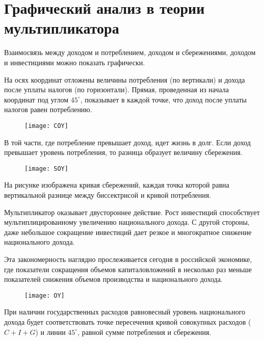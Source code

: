 \pagebreak %

\chapter{Графический анализ в теории мультипликатора}

Взаимосвязь между доходом и потреблением, доходом и сбережениями, доходом и
инвестициями можно показать графически.

На осях координат отложены величины потребления (по вертикали) и дохода после
уплаты налогов (по горизонтали). Прямая, проведенная из начала координат под
углом \( 45^\circ \), показывает в каждой точке, что доход после уплаты налогов
равен потреблению.

\begin{figure}[h!]
    \texttt{[image: COY]}
\end{figure}

В той части, где потребление превышает доход, идет жизнь в долг. Если доход
превышает уровень потребления, то разница образует величину сбережения.

\begin{figure}[h!]
    \texttt{[image: SOY]}
\end{figure}

На рисунке изображена кривая сбережений, каждая точка которой равна
вертикальной разнице между биссектрисой и кривой потребления.
 
Мультипликатор оказывает двустороннее действие. Рост инвестиций способствует
мультиплицированному увеличению национального дохода. С другой стороны, даже
небольшое сокращение инвестиций дает резкое и многократное снижение
национального дохода.

Эта закономерность наглядно прослеживается сегодня в российской экономике, где
показатели сокращения объемов капиталовложений в несколько раз меньше
показателей снижения объемов производства и национального дохода.

\begin{figure}[h!]
    \texttt{[image: OY]}
\end{figure}
 
При наличии государственных расходов равновесный уровень национального дохода
будет соответствовать точке пересечения кривой совокупных расходов
(\( C + I + G \)) и линии \( 45^\circ \), равной сумме потребления и сбережения.

\pagebreak %

